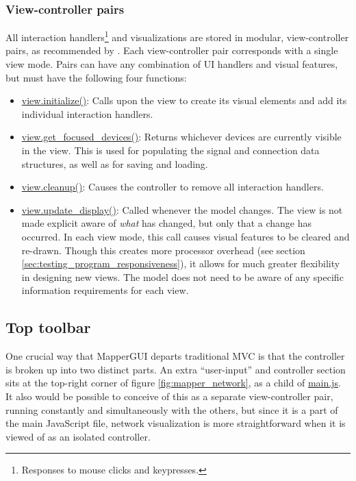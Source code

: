 		\subsubsection{View-controller pairs}

All interaction handlers\footnote{Responses to mouse clicks and keypresses.} and visualizations are stored in modular, view-controller pairs, as recommended by . Each view-controller pair corresponds with a single view mode. Pairs can have any combination of UI handlers and visual features, but must have the following four functions:

\begin{itemize}
	\item \url{view.initialize()}: Calls upon the view to create its visual elements and add its individual interaction handlers.
	\item \url{view.get_focused_devices()}: Returns whichever devices are currently visible in the view. This is used for populating the signal and connection data structures, as well as for saving and loading.
	\item \url{view.cleanup()}: Causes the controller to remove all interaction handlers.
	\item \url{view.update_display()}: Called whenever the model changes. The view is not made explicit aware of \emph{what} has changed, but only that a change has occurred. In each view mode, this call causes visual features to be cleared and re-drawn. Though this creates more processor overhead (see section \ref{sec:testing_program_responsiveness}), it allows for much greater flexibility in designing new views. The model does not need to be aware of any specific information requirements for each view.
\end{itemize}


	\subsection{Top toolbar} %
	\label{sec:top_toolbar}

One crucial way that MapperGUI departs traditional MVC is that the controller is broken up into two distinct parts. An extra ``user-input'' and controller section sits at the top-right corner of figure \ref{fig:mapper_network}, as a child of \url{main.js}.  It also would be possible to conceive of this as a separate view-controller pair, running constantly and simultaneously with the others, but since it is a part of the main JavaScript file, network visualization is more straightforward when it is viewed of as an isolated controller.

